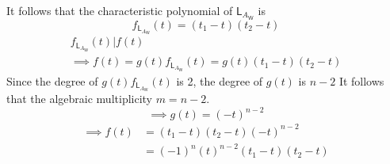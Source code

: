 It follows that the characteristic polynomial of
$\mathsf{L}_{A_\mathsf{W}}$ is 
\begin{equation}
f_{\mathsf{L}_{A_\mathsf{W}}}(t) = (t_1-t)(t_2-t)
\end{equation}
\begin{gather}
f_{\mathsf{L}_{A_\mathsf{W}}}(t) | f(t) \\
\implies f(t) = g(t)f_{\mathsf{L}_{A_\mathsf{W}}}(t) = g(t)(t_1-t)(t_2-t)
\end{gather}
Since the degree of $g(t)f_{\mathsf{L}_{A_\mathsf{W}}}(t)$ is 2, the
degree of $g(t)$ is $n-2$ It follows that the algebraic multiplicity
$m= n-2.$
\begin{equation}
\implies g(t) = (-t)^{n-2}
\end{equation}
\begin{align}
\implies f(t) &= (t_1-t)(t_2-t)(-t)^{n-2} \\
&= (-1)^n(t)^{n-2}(t_1-t)(t_2-t)
\end{align}
